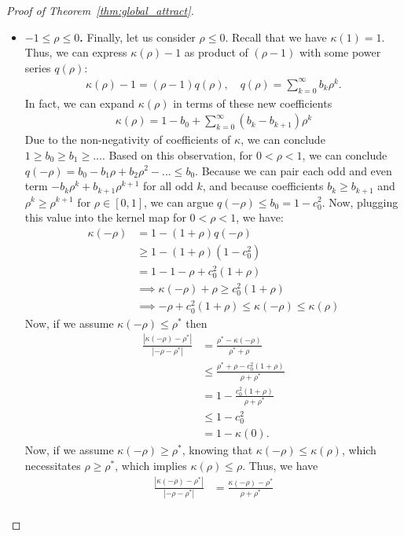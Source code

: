 \documentclass[twoside]{article}
\theoremstyle{definition}
\begin{document}
\begin{proof}[Proof of Theorem~\ref{thm:global_attract}]
\begin{itemize}
\item \textbf{$-1 \le \rho \le 0$.}
Finally, let us consider $\rho \le 0$. 
Recall that we have $\kappa(1) = 1$. Thus, we can express $\kappa(\rho)-1$ as product of $(\rho-1)$ with some power series $q(\rho)$:
\begin{align*}
\kappa(\rho) - 1 = (\rho-1)q(\rho), \quad q(\rho) = \sum_{k=0}^\infty b_k \rho^k.
\end{align*}
In fact, we can expand $\kappa(\rho)$ in terms of these new coefficients
\begin{align*}
\kappa(\rho) = 1-b_0 + \sum_{k=0}^\infty (b_k - b_{k+1}) \rho^k
\end{align*}
Due to the non-negativity of coefficients of $\kappa$, we can conclude $1\ge b_0 \ge b_1 \ge ...$. Based on this observation, for $0 < \rho < 1$, we can conclude
$q(-\rho) = b_0 - b_1 \rho + b_2 \rho^2 - ... \le b_0$. Because we can pair each odd and even term $-b_{k}\rho^k + b_{k+1} \rho^{k+1}$ for all odd $k$, and because coefficients $b_k \ge b_{k+1}$ and $\rho^{k} \ge \rho^{k+1}$ for $\rho \in [0,1]$, we can argue $q(-\rho) \le b_0 = 1 - c_0^2$. Now, plugging this value into the kernel map for $0 < \rho < 1$, we have:
\begin{align*}
\kappa(-\rho) &= 1 - (1+\rho)q(-\rho) \\
&\ge 1-(1+\rho)(1-c_0^2)\\
&= 1 - 1 - \rho + c_0^2 (1+\rho)\\
&\implies \kappa(-\rho) + \rho \ge c_0^2 (1+\rho)\\
&\implies -\rho + c_0^2(1+\rho) \le \kappa(-\rho) \le \kappa(\rho)
\end{align*}
Now, if we assume $\kappa(-\rho) \le \rho^*$ then
\begin{align*}
\frac{|\kappa(-\rho)-\rho^*|}{|-\rho-\rho^*|}&=\frac{\rho^* - \kappa(-\rho)}{\rho^* + \rho} \\
&\le \frac{\rho^* + \rho - c_0^2 (1+\rho)}{\rho+\rho^*} \\
&= 1- \frac{c_0^2(1+\rho)}{\rho+\rho^*} \\
&\le 1-c_0^2\\
&= 1 - \kappa(0).
\end{align*}
Now, if we assume $\kappa(-\rho) \ge \rho^*$, knowing that $\kappa(-\rho)\le \kappa(\rho)$, which necessitates $\rho\ge \rho^*$, which implies $\kappa(\rho)\le \rho$. Thus, we have
\begin{align*}
\frac{|\kappa(-\rho)-\rho^*|}{|-\rho-\rho^*|} &= \frac{\kappa(-\rho)-\rho^*}{\rho+\rho^*}\\

\end{align*}
\end{itemize}
\end{proof}
\end{document}
